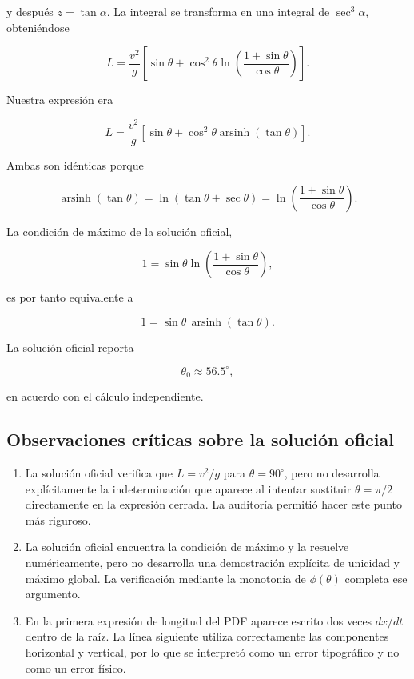 y después \(z=\tan\alpha\). La integral se transforma en una integral de \(\sec^3\alpha\), obteniéndose

\[
L
=
\frac{v^2}{g}
\left[
\sin\theta+
\cos^2\theta
\ln\left(
\frac{1+\sin\theta}{\cos\theta}
\right)
\right].
\]

Nuestra expresión era

\[
L
=
\frac{v^2}{g}
\left[
\sin\theta+
\cos^2\theta
\operatorname{arsinh}(\tan\theta)
\right].
\]

Ambas son idénticas porque

\[
\operatorname{arsinh}(\tan\theta)
=
\ln\left(\tan\theta+\sec\theta\right)
=
\ln\left(
\frac{1+\sin\theta}{\cos\theta}
\right).
\]

La condición de máximo de la solución oficial,

\[
1
=
\sin\theta
\ln\left(
\frac{1+\sin\theta}{\cos\theta}
\right),
\]

es por tanto equivalente a

\[
1
=
\sin\theta\,
\operatorname{arsinh}(\tan\theta).
\]

La solución oficial reporta

\[
\theta_0\approx56.5^\circ,
\]

en acuerdo con el cálculo independiente.

\subsection*{Observaciones críticas sobre la solución oficial}

\begin{enumerate}
    \item La solución oficial verifica que \(L=v^2/g\) para \(\theta=90^\circ\), pero no desarrolla explícitamente la indeterminación que aparece al intentar sustituir \(\theta=\pi/2\) directamente en la expresión cerrada. La auditoría permitió hacer este punto más riguroso.
    \item La solución oficial encuentra la condición de máximo y la resuelve numéricamente, pero no desarrolla una demostración explícita de unicidad y máximo global. La verificación mediante la monotonía de \(\phi(\theta)\) completa ese argumento.
    \item En la primera expresión de longitud del PDF aparece escrito dos veces \(dx/dt\) dentro de la raíz. La línea siguiente utiliza correctamente las componentes horizontal y vertical, por lo que se interpretó como un error tipográfico y no como un error físico.
\end{enumerate}

